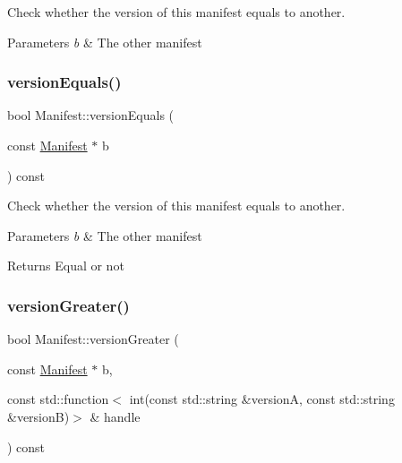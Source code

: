 Check whether the version of this manifest equals to another. 


\begin{DoxyParams}{Parameters}
{\em b} & The other manifest \\
\hline
\end{DoxyParams}
\mbox{\label{classManifest_acafa28b00d8f3776432ce9b6b034214f}} 
\subsubsection{\texorpdfstring{version\+Equals()}{versionEquals()}\hspace{0.1cm}{\footnotesize\ttfamily [2/2]}}
{\footnotesize\ttfamily bool Manifest\+::version\+Equals (\begin{DoxyParamCaption}\item[{const \hyperlink{classManifest}{Manifest} $\ast$}]{b }\end{DoxyParamCaption}) const\hspace{0.3cm}{\ttfamily [protected]}}



Check whether the version of this manifest equals to another. 


\begin{DoxyParams}{Parameters}
{\em b} & The other manifest \\
\hline
\end{DoxyParams}
\begin{DoxyReturn}{Returns}
Equal or not 
\end{DoxyReturn}
\mbox{\label{classManifest_aa5922402496c604be194bc081dab7673}} 
\subsubsection{\texorpdfstring{version\+Greater()}{versionGreater()}}
{\footnotesize\ttfamily bool Manifest\+::version\+Greater (\begin{DoxyParamCaption}\item[{const \hyperlink{classManifest}{Manifest} $\ast$}]{b,  }\item[{const std\+::function$<$ int(const std\+::string \&versionA, const std\+::string \&versionB)$>$ \&}]{handle }\end{DoxyParamCaption}) const\hspace{0.3cm}{\ttfamily [protected]}}



